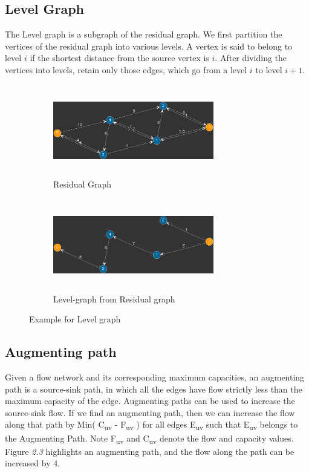 \documentclass[paper=a4, fontsize=11pt]{scrartcl} %
\numberwithin{equation}{section} %
\numberwithin{figure}{section} %
\numberwithin{table}{section} %
\begin{document}

\subsection{Level Graph}

The Level graph is a subgraph of the residual graph. We first partition the vertices of the residual graph into various levels. A vertex is said to belong to level $i$ if the shortest distance from the source vertex is $i$. After dividing the vertices into levels, retain only those edges, which go from a level $i$ to level $i+1$.


\begin{figure}[h]
\begin{subfigure}{0.5\textwidth}
\includegraphics[width=7cm, height=4cm,center]{p5.png}
\caption{Residual Graph}
\label{fig:subim1}
\end{subfigure}
\begin{subfigure}{0.5\textwidth}
\includegraphics[width=7cm, height=4cm,center]{p7.png}
\caption{Level-graph from Residual graph}
\label{fig:subim2}
\end{subfigure}

\caption{Example for Level graph}
\label{fig:image2}
\end{figure}

\subsection{Augmenting path}

Given a flow network and its corresponding maximum capacities, an augmenting path is a source-sink path, in which all the edges have flow strictly less than the maximum capacity of the edge. Augmenting paths can be used to increase the source-sink flow. If we find an augmenting path, then we can increase the flow along that path by Min( C\textsubscript{uv} - F\textsubscript{uv} ) for all edges E\textsubscript{uv} such that E\textsubscript{uv} belongs to the Augmenting Path. Note F\textsubscript{uv} and C\textsubscript{uv} denote the flow and capacity values. Figure \textit{2.3} highlights an augmenting path, and the flow along the path can be increased by 4.
\end{document}
